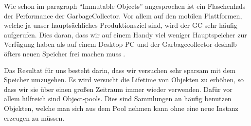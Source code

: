 
Wie schon im paragraph ``Immutable Objects'' angesprochen ist ein Flaschenhals der Performance der GarbageCollector.
Vor allem auf den mobilen Plattformen, welche ja unser hauptsächliches Produktionsziel sind, wird der GC sehr häufig aufgerufen. Dies daran, dass wir auf einem Handy viel weniger Hauptspeicher zur Verfügung haben als auf einem Desktop PC und der Garbagecollector deshalb öfters neuen Speicher frei machen muss .


Das Resultat für uns besteht darin, dass wir versuchen sehr sparsam mit dem Speicher umzugehen. Es wird versucht die Lifetime von Objekten zu erhöhen, so dass wir sie über einen großen Zeitraum immer wieder verwenden. Dafür vor allem hilfreich sind Object-pools. Dies sind Sammlungen an häufig benutzen Objekten, welche man sich aus dem Pool nehmen kann ohne eine neue Instanz erzeugen zu müssen.